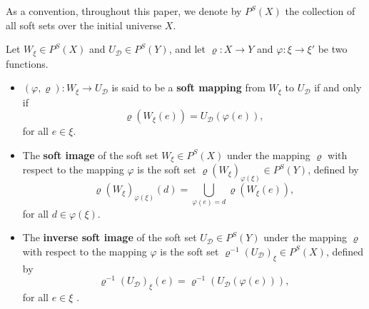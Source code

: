 \documentclass[preprint,12pt]{elsarticle}
\begin{document}

As a convention, throughout this paper, we denote by $P^S(X)$ the collection of all soft sets over the initial universe $X$.

\begin{defn}\em{ Let \( W_\xi  \in P^S(X) \) and \( U_{\mathscr{D}} \in P^S(Y) \), and let  \( \varrho: X \rightarrow Y \) and \( \varphi: \xi \rightarrow \xi' \) be two functions.
\begin{itemize}
 \item[(i)]
\( (\varphi, \varrho): W_\xi \rightarrow U_{\mathscr{D}} \) is said to be a \textbf{soft mapping} from \( W_\xi \) to \( U_{\mathscr{D}} \)
if and only if
\[
\varrho(W_\xi(e)) = U_{\mathscr{D}}(\varphi(e)),
\]
for all $ e \in \xi.$
\item[(ii)]
The \textbf{soft image} of the soft set \( W_\xi \in P^S(X) \) under the mapping \( \varrho\) with respect to the mapping \( \varphi \)
is the soft set \( \varrho(W_\xi)_{\varphi(\xi)} \in  P^S(Y) \), defined by
\[
\varrho(W_\xi)_{\varphi(\xi)}(d) = \bigcup_{\varphi(e) = d} \varrho(W_\xi(e)),\]
for all \(d \in \varphi(\xi).\)
\item[(iii)]
The \textbf{inverse soft image} of the soft set \(U_{\mathscr{D}} \in P^S(Y) \) under the mapping \( \varrho \) with respect to the mapping \( \varphi \)
is the soft set \( \varrho^{-1}(U_{\mathscr{D}})_\xi \in P^S(X) \), defined by
\[
\varrho^{-1}(U_{\mathscr{D}})_\xi(e) = \varrho^{-1}(U_{\mathscr{D}}(\varphi(e))),
\]
for all $e \in \xi$ \cite{Kha}.

\end{itemize}
}
\end{defn}
\end{document}
